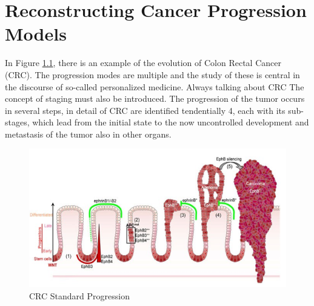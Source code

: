 \chapter{Reconstructing Cancer Progression Models}
In Figure \ref{fig:CRC}, there is an example of the evolution of Colon Rectal Cancer (CRC).
The progression modes are multiple and the study of these is central in the discourse
of so-called personalized medicine. Always talking about CRC The concept of staging
must also be introduced. The progression of the tumor occurs in several steps, in
detail of CRC are identified tendentially 4, each with its sub-stages, which lead from
the initial state to the now uncontrolled development and metastasis of the tumor also
in other organs.

\begin{figure}[!ht]
    \centering
    \includegraphics[width=0.5\linewidth]{img/CancerProgression/CRC.png}
    \caption{CRC Standard Progression}
    \label{fig:CRC}
\end{figure}

